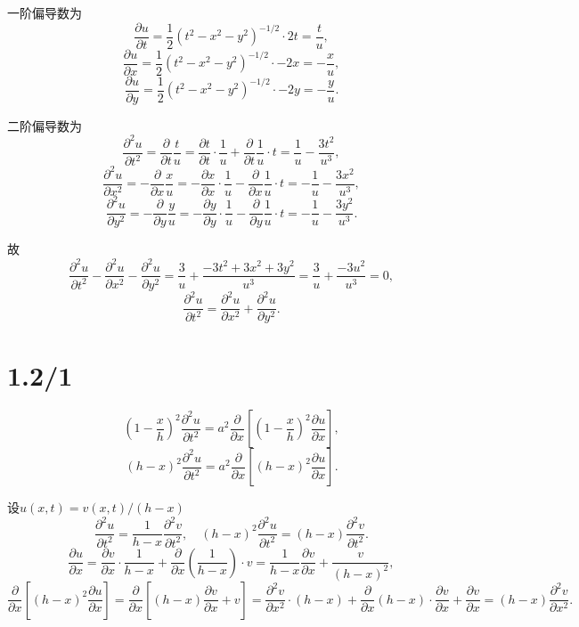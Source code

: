 \documentclass[11pt,a4paper]{article}
\begin{document}
一阶偏导数为
$$\frac{\partial u}{\partial t}=\frac{1}{2}(t^2-x^2-y^2)^{-1/2}\cdot 2t=\frac{t}{u},$$
$$\frac{\partial u}{\partial x}=\frac{1}{2}(t^2-x^2-y^2)^{-1/2}\cdot -2x=-\frac{x}{u},$$
$$\frac{\partial u}{\partial y}=\frac{1}{2}(t^2-x^2-y^2)^{-1/2}\cdot -2y=-\frac{y}{u}.$$

二阶偏导数为
$$\frac{\partial^2 u}{\partial t^2}=\frac{\partial}{\partial t}\frac{t}{u}=\frac{\partial t}{\partial t}\cdot \frac{1}{u}+\frac{\partial}{\partial t}\frac{1}{u}\cdot t=\frac{1}{u}-\frac{3t^2}{u^3},$$
$$\frac{\partial^2 u}{\partial x^2}=-\frac{\partial}{\partial x}\frac{x}{u}=-\frac{\partial x}{\partial x}\cdot \frac{1}{u}-\frac{\partial}{\partial x}\frac{1}{u}\cdot t=-\frac{1}{u}-\frac{3x^2}{u^3},$$
$$\frac{\partial^2 u}{\partial y^2}=-\frac{\partial}{\partial y}\frac{y}{u}=-\frac{\partial y}{\partial y}\cdot \frac{1}{u}-\frac{\partial}{\partial y}\frac{1}{u}\cdot t=-\frac{1}{u}-\frac{3y^2}{u^3}.$$

故
$$\frac{\partial^2 u}{\partial t^2}-\frac{\partial^2 u}{\partial x^2}-\frac{\partial^2 u}{\partial y^2}=\frac{3}{u}+\frac{-3t^2+3x^2+3y^2}{u^3}=\frac{3}{u}+\frac{-3u^2}{u^3}=0,$$
$$\frac{\partial^2 u}{\partial t^2}=\frac{\partial^2 u}{\partial x^2}+\frac{\partial^2 u}{\partial y^2}.$$

\section{1.2/1}
\begin{problem}

\end{problem}

$$\left(1-\frac{x}{h}\right)^2\frac{\partial^2 u}{\partial t^2}=a^2\frac{\partial}{\partial x}\left[\left(1-\frac{x}{h}\right)^2\frac{\partial u}{\partial x}\right],$$
$$(h-x)^2\frac{\partial^2 u}{\partial t^2}=a^2\frac{\partial}{\partial x}\left[(h-x)^2\frac{\partial u}{\partial x}\right].$$

设$u(x,t)=v(x,t)/(h-x)$
$$\frac{\partial^2 u}{\partial t^2}=\frac{1}{h-x}\frac{\partial^2 v}{\partial t^2},\quad (h-x)^2\frac{\partial^2 u}{\partial t^2}=(h-x)\frac{\partial^2 v}{\partial t^2}.$$
$$\frac{\partial u}{\partial x}=\frac{\partial v}{\partial x}\cdot\frac{1}{h-x}+\frac{\partial}{\partial x}\left(\frac{1}{h-x}\right)\cdot v=\frac{1}{h-x}\frac{\partial v}{\partial x}+\frac{v}{(h-x)^2},$$
$$\frac{\partial}{\partial x}\left[(h-x)^2\frac{\partial u}{\partial x}\right]=\frac{\partial}{\partial x}\left[(h-x)\frac{\partial v}{\partial x}+v\right]=
  \frac{\partial^2 v}{\partial x^2}\cdot(h-x)+\frac{\partial}{\partial x}(h-x)\cdot\frac{\partial v}{\partial x}+\frac{\partial v}{\partial x}=(h-x)\frac{\partial^2 v}{\partial x^2}.$$
\end{document}

